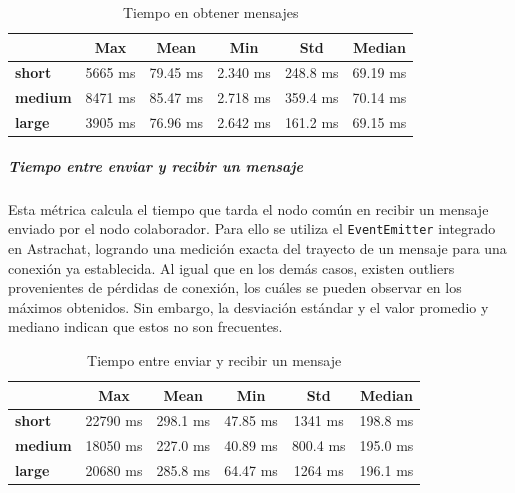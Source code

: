 \setlength\tabcolsep{10pt}
\begin{table}[!htbp]
    \centering
    \begin{tabular}{|l|c|c|c|c|c|}
        \hline
        & \textbf{Max} & \textbf{Mean} & \textbf{Min} & \textbf{Std} & \textbf{Median} \\ \hline
        \textbf{short} & 5665 ms & 79.45 ms & 2.340 ms & 248.8 ms & 69.19 ms \\ \hline
        \textbf{medium} & 8471 ms & 85.47 ms & 2.718 ms & 359.4 ms & 70.14 ms \\ \hline
        \textbf{large} & 3905 ms & 76.96 ms & 2.642 ms & 161.2 ms & 69.15 ms \\ \hline
    \end{tabular}
    \caption{Tiempo en obtener mensajes}
\end{table}  

\subparagraph{Tiempo entre enviar y recibir un mensaje}

Esta métrica calcula el tiempo que tarda el nodo común en recibir un mensaje enviado por el nodo colaborador. Para ello se utiliza el \texttt{EventEmitter} integrado en Astrachat, logrando una medición exacta del trayecto de un mensaje para una conexión ya establecida. Al igual que en los demás casos, existen outliers provenientes de pérdidas de conexión, los cuáles se pueden observar en los máximos obtenidos. Sin embargo, la desviación estándar y el valor promedio y mediano indican que estos no son frecuentes.

\setlength\tabcolsep{10pt}
\begin{table}[!htbp]
    \centering
    \begin{tabular}{|l|c|c|c|c|c|}
        \hline
        & \textbf{Max} & \textbf{Mean} & \textbf{Min} & \textbf{Std} & \textbf{Median} \\ \hline
        \textbf{short} & 22790 ms & 298.1 ms & 47.85 ms & 1341 ms & 198.8 ms \\ \hline
        \textbf{medium} & 18050 ms & 227.0 ms & 40.89 ms & 800.4 ms & 195.0 ms \\ \hline
        \textbf{large} & 20680 ms & 285.8 ms & 64.47 ms & 1264 ms & 196.1 ms \\ \hline
    \end{tabular}
    \caption{Tiempo entre enviar y recibir un mensaje}
\end{table}  
